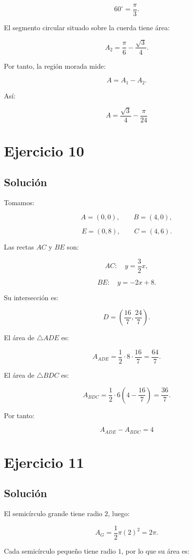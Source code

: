 \documentclass[11pt,a4paper]{article}
\begin{document}
\[
60^\circ=\frac{\pi}{3}.
\]

El segmento circular situado sobre la cuerda tiene área:

\[
A_2
=
\frac{\pi}{6}
-
\frac{\sqrt3}{4}.
\]

Por tanto, la región morada mide:

\[
A
=
A_1-A_2.
\]

Así:

\[
\boxed{
A
=
\frac{\sqrt3}{4}
-
\frac{\pi}{24}
}
\]

\section{Ejercicio 10}
\subsection{Solución}

Tomamos:

\[
A=(0,0),
\qquad
B=(4,0),
\]

\[
E=(0,8),
\qquad
C=(4,6).
\]

Las rectas \(AC\) y \(BE\) son:

\[
AC:
\quad
y=\frac32x,
\]

\[
BE:
\quad
y=-2x+8.
\]

Su intersección es:

\[
D=
\left(
\frac{16}{7},
\frac{24}{7}
\right).
\]

El área de \(\triangle ADE\) es:

\[
A_{ADE}
=
\frac12\cdot8\cdot\frac{16}{7}
=
\frac{64}{7}.
\]

El área de \(\triangle BDC\) es:

\[
A_{BDC}
=
\frac12\cdot6
\left(
4-\frac{16}{7}
\right)
=
\frac{36}{7}.
\]

Por tanto:

\[
\boxed{
A_{ADE}-A_{BDC}=4
}
\]

\section{Ejercicio 11}
\subsection{Solución}

El semicírculo grande tiene radio \(2\), luego:

\[
A_G
=
\frac12\pi(2)^2
=
2\pi.
\]

Cada semicírculo pequeño tiene radio \(1\), por lo que su área es:
\end{document}
